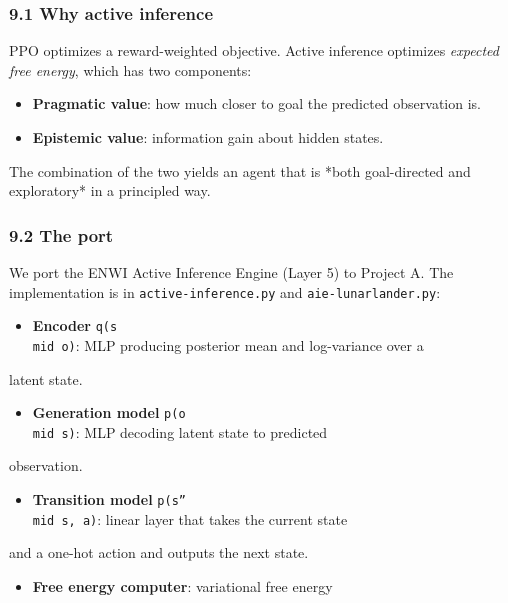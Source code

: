 \documentclass[11pt]{article}
\begin{document}
\subsubsection{9.1 Why active inference}

PPO optimizes a reward-weighted objective. Active inference optimizes
\textit{expected free energy}, which has two components:

\begin{itemize}
  \item \textbf{Pragmatic value}: how much closer to goal the predicted observation is.
  \item \textbf{Epistemic value}: information gain about hidden states.
\end{itemize}


The combination of the two yields an agent that is *both goal-directed and
exploratory* in a principled way.

\subsubsection{9.2 The port}


We port the ENWI Active Inference Engine (Layer 5) to Project A. The
implementation is in \texttt{active-inference.py} and \texttt{aie-lunarlander.py}:

\begin{itemize}
  \item \textbf{Encoder} \texttt{q(s\\mid o)}: MLP producing posterior mean and log-variance over a
\end{itemize}

  latent state.
\begin{itemize}
  \item \textbf{Generation model} \texttt{p(o\\mid s)}: MLP decoding latent state to predicted
\end{itemize}

  observation.
\begin{itemize}
  \item \textbf{Transition model} \texttt{p(s''\\mid s, a)}: linear layer that takes the current state
\end{itemize}

  and a one-hot action and outputs the next state.
\begin{itemize}
  \item \textbf{Free energy computer}: variational free energy
\end{itemize}
\end{document}
